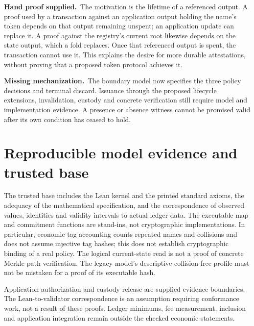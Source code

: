 \documentclass[runningheads]{llncs}
\newcommand{\hand}{\par\noindent\textcolor{blue!65!black}{\textbf{Hand proof supplied.}}\ }
\newcommand{\missing}{\par\noindent\textcolor{red!65!black}{\textbf{Missing mechanization.}}\ }
\begin{document}
\hand The motivation is the lifetime of a referenced output. A proof used
by a transaction against an application output holding the name's token
depends on that output remaining unspent; an application update can replace
it. A proof against the registry's current root likewise depends on the
state output, which a fold replaces. Once that referenced output is spent,
the transaction cannot use it. This explains the desire for more durable
attestations, without proving that a proposed token protocol achieves it.
\missing The boundary model now specifies the three policy decisions and
terminal discard. Issuance through the proposed lifecycle extensions,
invalidation, custody and concrete verification still require model and
implementation evidence. A presence or absence witness cannot be promised valid after
its own condition has ceased to hold.

\clearpage
\appendix
\section{Reproducible model evidence and trusted base}
\label{sec:artifact}


The trusted base includes the Lean kernel and the printed standard axioms,
the adequacy of the mathematical specification, and the correspondence of
observed values, identities and validity intervals to actual ledger data.
The executable map and commitment functions are stand-ins, not cryptographic
implementations. In particular, economic tag accounting counts repeated names
and collisions and does not assume injective tag hashes; this does not establish
cryptographic binding of a real policy. The logical current-state read is not
a proof of concrete Merkle-path verification. The legacy model's descriptive
collision-free profile must not be mistaken for a proof of its executable hash.

Application authorization and custody release are supplied evidence boundaries.
The Lean-to-validator correspondence is an assumption requiring conformance
work, not a result of these proofs. Ledger minimums, fee measurement, inclusion
and application integration remain outside the checked economic statements.

\clearpage


\end{document}

